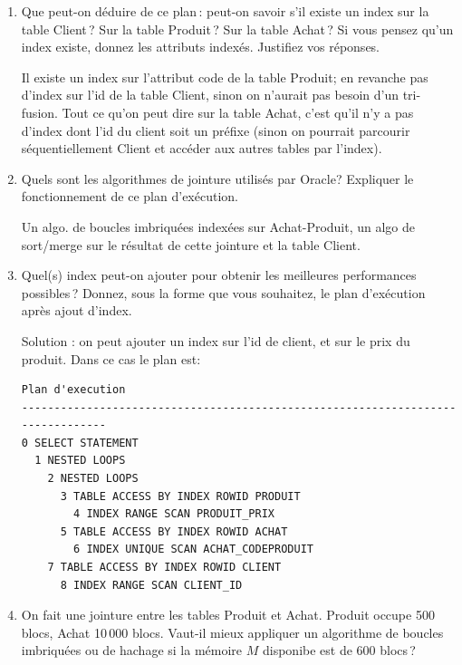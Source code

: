 \begin{enumerate}
 \item Que peut-on déduire de ce plan\,: peut-on savoir s'il
    existe un index sur la table Client\,? 
   Sur la table Produit\,? Sur la table Achat\,? Si vous pensez
   qu'un index existe, donnez les attributs indexés. 
     Justifiez vos réponses.

\begin{solution}
Il existe un index sur l'attribut code de la table Produit;
en revanche pas d'index sur l'id de la table Client, sinon
on n'aurait  pas besoin d'un tri-fusion. Tout ce qu'on peut
dire sur la table Achat, c'est qu'il n'y a pas d'index dont
l'id du client soit un préfixe (sinon on pourrait parcourir séquentiellement
Client et accéder aux autres tables par l'index).
\end{solution}

  \item Quels sont les algorithmes de jointure utilisés par Oracle? 
      Expliquer le fonctionnement de ce plan d'exécution.

\begin{solution}
Un algo. de boucles imbriquées indexées sur Achat-Produit, un
algo de sort/merge sur le résultat de cette jointure et la
table Client.
\end{solution}

  \item Quel(s) index  peut-on ajouter pour obtenir les meilleures
      performances possibles\,? Donnez, sous la forme 
      que vous souhaitez, le plan d'exécution
        après ajout d'index.

\begin{solution}
Solution : on peut ajouter un index sur l'id de client, et sur le
prix du produit. Dans ce cas le plan est:

\begin{verbatim}
Plan d'execution
--------------------------------------------------------------------------------
0 SELECT STATEMENT
  1 NESTED LOOPS
    2 NESTED LOOPS
      3 TABLE ACCESS BY INDEX ROWID PRODUIT
        4 INDEX RANGE SCAN PRODUIT_PRIX
      5 TABLE ACCESS BY INDEX ROWID ACHAT
        6 INDEX UNIQUE SCAN ACHAT_CODEPRODUIT
    7 TABLE ACCESS BY INDEX ROWID CLIENT
      8 INDEX RANGE SCAN CLIENT_ID
\end{verbatim}
\end{solution}

  \item On fait une jointure entre les tables Produit et Achat.
   Produit occupe 500 blocs, Achat 10\,000 blocs. Vaut-il mieux 
    appliquer un algorithme de boucles imbriquées ou de hachage
    si la mémoire $M$ disponibe est de $600$ blocs\,? 
    

\end{enumerate}
